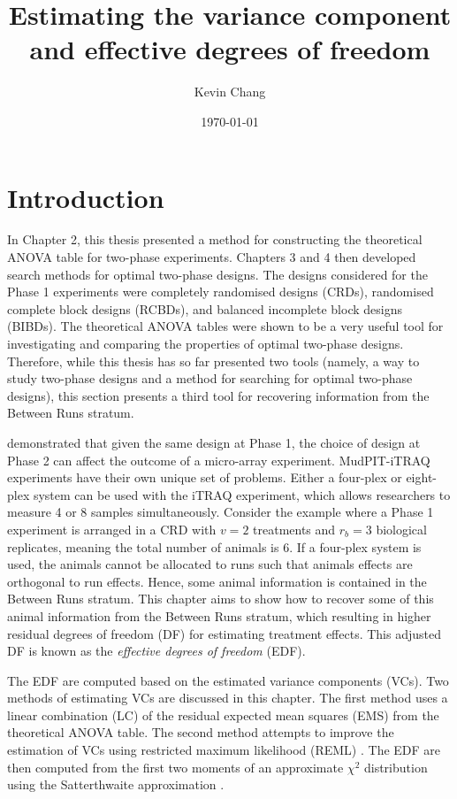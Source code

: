 \documentclass[12pt,a4paper]{article}
\begin{document}
\title{Estimating the variance component and effective degrees of freedom}
\author{Kevin Chang}
\date{\today}
\maketitle

\section{Introduction}
\label{sec:intro}
In Chapter 2, this thesis presented a method for constructing the theoretical ANOVA table for two-phase experiments. Chapters 3 and 4 then developed search methods for optimal two-phase designs. The designs considered for the Phase 1 experiments were completely randomised designs (CRDs), randomised complete block designs (RCBDs), and balanced incomplete block designs (BIBDs). The theoretical ANOVA tables were shown to be a very useful tool for investigating and comparing the properties of optimal two-phase designs. Therefore, while this thesis has so far presented two tools (namely, a way to study two-phase designs and a method for searching for optimal two-phase designs), this section presents a third tool for recovering information from the Between Runs stratum.

\cite{Jarrett2008} demonstrated that given the same design at Phase 1, the choice of design at Phase 2 can affect the outcome of a micro-array experiment. MudPIT-iTRAQ experiments have their own unique set of problems. Either a four-plex or eight-plex system can be used with the iTRAQ experiment, which allows researchers to measure 4 or 8 samples simultaneously. Consider the example where a Phase 1 experiment is arranged in a CRD with $v = 2$ treatments and $r_b = 3$ biological replicates, meaning the total number of animals is 6. If a four-plex system is used, the animals cannot be allocated to runs such that animals effects are orthogonal to run effects. Hence, some animal information is contained in the Between Runs stratum. This chapter aims to show how to recover some of this animal information from the Between Runs stratum, which resulting in higher residual degrees of freedom (DF) for estimating treatment effects. This adjusted DF is known as the \emph{effective degrees of freedom} (EDF). 

The EDF are computed based on the estimated variance components (VCs). Two methods of estimating VCs are discussed in this chapter. The first method uses a linear combination (LC) of the residual expected mean squares (EMS) from the theoretical ANOVA table. The second method attempts to improve the estimation of VCs using restricted maximum likelihood (REML) \citep{Patterson1971}. The EDF are then computed from the first two moments of an approximate $\chi^2$ distribution using the Satterthwaite approximation \citep{Satterthwaite1946, Jarrett2008}.
 
\end{document}
